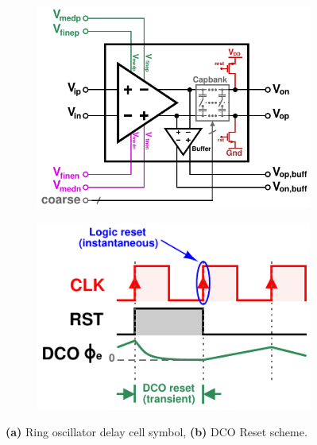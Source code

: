 	\begin{figure}[htb!]
	    \centering
	    \begin{subfigure}{0.5\textwidth}
	        \centering
	        \includegraphics[width=1\textwidth, angle=0]{./figs/design/delay_cell_symbol_full}
	        \caption{ }
	        \label{fig:delay_cell_symbol}
	    \end{subfigure}%
	    \begin{subfigure}{0.5\textwidth}
	        \centering
	        \includegraphics[width=1\textwidth, angle=0]{./figs/pll_reset}
	        \caption{ }
	        \label{fig:dco_reset}
	    \end{subfigure}
	    \label{fig:vco_symbol_reset}
	    \caption{\textbf{(a)} Ring oscillator delay cell symbol, \textbf{(b)} DCO Reset scheme.}
	\end{figure} 

